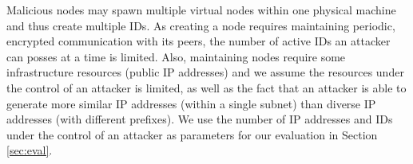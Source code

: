 Malicious nodes may spawn multiple virtual nodes within one physical machine and thus create multiple IDs. 
As creating a node requires maintaining periodic,  encrypted communication with its peers,  the number of active IDs an attacker can posses at a time is limited. 
Also,  maintaining nodes require some infrastructure resources (public IP addresses) and we assume the resources under the control of an attacker is limited, as well as the fact 
that an attacker is able to generate more similar IP addresses (within a single subnet) than diverse IP addresses (with different prefixes). 
We use the number of IP addresses and IDs under the control of an attacker as parameters for our evaluation in Section \ref{sec:eval}.



